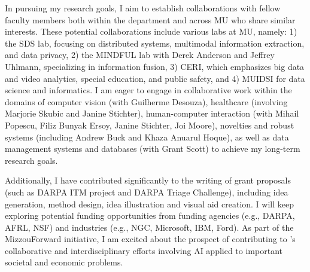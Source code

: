 \documentclass[11pt]{article}
\begin{document}
%
In pursuing my research goals, I aim to establish collaborations with fellow faculty members both within the department and across MU who share similar interests. These potential collaborations include various labs at MU, namely:
1) the SDS lab, focusing on distributed systems, multimodal information extraction, and data privacy,
2) the MINDFUL lab with Derek Anderson and Jeffrey Uhlmann, specializing in information fusion,
3) CERI, which emphasizes big data and video analytics, special education, and public safety, and
4) MUIDSI for data science and informatics.
I am eager to engage in collaborative work within the domains of computer vision (with Guilherme Desouza), healthcare (involving Marjorie Skubic and Janine Stichter), human-computer interaction (with Mihail Popescu, Filiz Bunyak Ersoy, Janine Stichter, Joi Moore), novelties and robust systems (including Andrew Buck and Khaza Anuarul Hoque), as well as data management systems and databases (with Grant Scott)
to achieve my long-term research goals.

Additionally, I have contributed significantly to the writing of grant proposals (such as DARPA ITM project and DARPA Triage Challenge), including idea generation, method design, idea illustration and visual aid creation. I will keep exploring potential funding opportunities from funding agencies (e.g., DARPA, AFRL, NSF)
and industries (e.g., NGC, Microsoft, IBM, Ford).
As part of the MizzouForward initiative, I am excited about the prospect of contributing to \shortInstitutionName{}'s collaborative and interdisciplinary efforts involving AI applied to important societal and economic problems.

\end{document}
